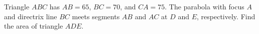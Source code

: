Triangle $ABC$ has $AB=65$, $BC=70$, and $CA=75$. The parabola with focus $A$ and directrix line $BC$ meets segments $AB$ and $AC$ at $D$ and $E$, respectively. Find the area of triangle $ADE$.
